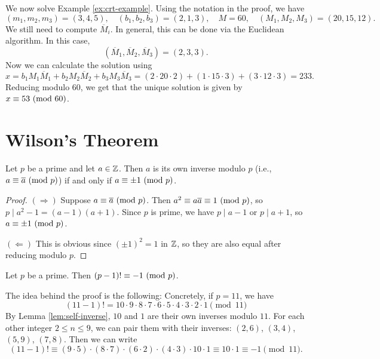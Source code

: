 \begin{example}
  We now solve Example
  \ref{ex:crt-example}. Using the
  notation in the proof, we have
  \[
    (m_1, m_2, m_3) = (3, 4, 5), \quad
    (b_1, b_2, b_3) = (2, 1, 3), \quad
    M = 60,
    \quad
    (M_1, M_2, M_3) = (20, 15, 12).
  \]
  We still need to compute
  $\overline{M}_i$. In general, this
  can be done via the Euclidean algorithm.
  In this case,
  \[
    (\overline{M}_1, \overline{M}_2, \overline{M}_3)
    = (2, 3, 3).
  \]
  Now we can calculate the solution
  using
  \[
    x = b_1 M_1 \overline{M}_1
    + b_2 M_2 \overline{M}_2
    + b_3 M_3 \overline{M}_3
    = (2 \cdot 20 \cdot 2)
    + (1 \cdot 15 \cdot 3)
    + (3 \cdot 12 \cdot 3)
    = 233.
  \]
  Reducing modulo $60$, we get that the
  unique solution is given by
  $x \equiv 53 \ (\mathrm{mod}\ 60)$.
\end{example}

\section{Wilson's Theorem}

\begin{lemma}\label{lem:self-inverse}
  Let $p$ be a prime and let
  $a \in \mathbb{Z}$. Then
  $a$ is its own inverse modulo $p$
  (i.e., $a \equiv \overline{a} \ (\mathrm{mod}\ p)$)
  if and only if $a \equiv \pm 1 \ (\mathrm{mod}\ p)$.
\end{lemma}

\begin{proof}
  $(\Rightarrow)$ Suppose
  $a \equiv \overline{a} \ (\mathrm{mod}\ p)$.
  Then $a^2 \equiv a \overline{a} \equiv 1 \ (\mathrm{mod}\ p)$, so
  $p \mid a^2 - 1 = (a - 1)(a + 1)$.
  Since $p$ is prime, we have
  $p \mid a - 1$ or $p \mid a + 1$, so
  $a \equiv \pm 1 \ (\mathrm{mod}\ p)$.

  $(\Leftarrow)$ This is obvious since
  $(\pm 1)^2 = 1$ in $\mathbb{Z}$, so they
  are also equal after reducing modulo $p$.
\end{proof}

\begin{theorem}\label{thm:wilson}
  Let $p$ be a prime. Then
  $(p - 1)! \equiv -1 \ (\mathrm{mod}\ p)$.
\end{theorem}

\begin{example}
  The idea behind the proof is the
  following: Concretely, if $p = 11$, we
  have
  \[
    (11 - 1)! =
    10 \cdot 9 \cdot 8 \cdot 7 \cdot 6 \cdot
    5 \cdot 4 \cdot 3 \cdot 2 \cdot 1
    \pmod{11}
  \]
  By Lemma \ref{lem:self-inverse},
  $10$ and $1$ are their own inverses
  modulo $11$.
  For each other integer $2 \le n \le 9$,
  we can pair them with their inverses:
  $(2, 6)$, $(3, 4)$, $(5, 9)$, $(7, 8)$.
  Then we can write
  \[
    (11 - 1)!
    \equiv (9 \cdot 5) \cdot (8 \cdot 7)
    \cdot (6 \cdot 2) \cdot (4 \cdot 3)
    \cdot 10 \cdot 1
    \equiv 10 \cdot 1 \equiv -1 \pmod{11}.
  \]
\end{example}

